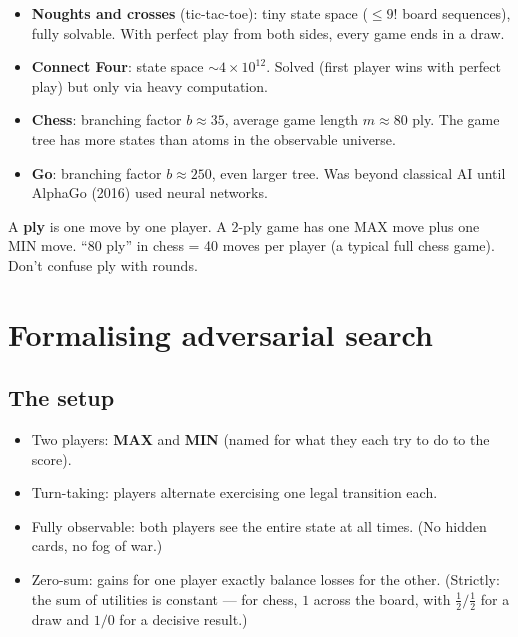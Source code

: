 \documentclass[11pt, a4paper]{article}
\begin{document}
\begin{itemize}
  \item \textbf{Noughts and crosses} (tic-tac-toe): tiny state space ($\le 9!$ board sequences), fully solvable. With perfect play from both sides, every game ends in a draw.
  \item \textbf{Connect Four}: state space $\sim 4 \times 10^{12}$. Solved (first player wins with perfect play) but only via heavy computation.
  \item \textbf{Chess}: branching factor $b \approx 35$, average game length $m \approx 80$ ply. The game tree has more states than atoms in the observable universe.
  \item \textbf{Go}: branching factor $b \approx 250$, even larger tree. Was beyond classical AI until AlphaGo (2016) used neural networks.
\end{itemize}

\begin{notebox}[: ply]
A \textbf{ply} is one move by one player. A 2-ply game has one MAX move plus one MIN move. ``80 ply'' in chess = 40 moves per player (a typical full chess game). Don't confuse ply with rounds.
\end{notebox}

\section{Formalising adversarial search}

\subsection{The setup}

\begin{defbox}
\begin{itemize}[leftmargin=*]
  \item Two players: \textbf{MAX} and \textbf{MIN} (named for what they each try to do to the score).
  \item Turn-taking: players alternate exercising one legal transition each.
  \item Fully observable: both players see the entire state at all times. (No hidden cards, no fog of war.)
  \item Zero-sum: gains for one player exactly balance losses for the other. (Strictly: the sum of utilities is constant — for chess, $1$ across the board, with $\frac{1}{2}/\frac{1}{2}$ for a draw and $1/0$ for a decisive result.)
\end{itemize}
\end{defbox}
\end{document}
